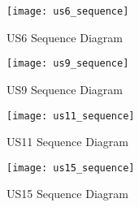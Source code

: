 \begin{figure}[H]
    \centering
    \texttt{[image: us6\_sequence]}
    \caption{US6 Sequence Diagram}
    \label{fig:us6_sequence}
\end{figure}

\begin{figure}[H]
    \centering
    \texttt{[image: us9\_sequence]}
    \caption{US9 Sequence Diagram}
    \label{fig:us9_sequence}
\end{figure}

\begin{figure}[H]
    \centering
    \texttt{[image: us11\_sequence]}
    \caption{US11 Sequence Diagram}
    \label{fig:us11_sequence}
\end{figure}

\begin{figure}[H]
    \centering
    \texttt{[image: us15\_sequence]}
    \caption{US15 Sequence Diagram}
    \label{fig:us15_sequence}
\end{figure}
